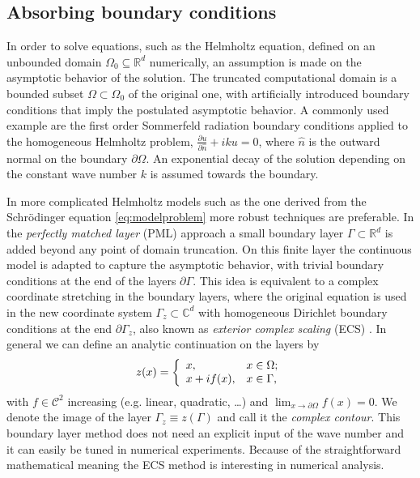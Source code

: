 \documentclass[mathpazo]{cicp}
\theoremstyle{definition}
\numberwithin{equation}{section}
\begin{document}
\subsection{Absorbing boundary conditions}
In order to solve equations, such as the Helmholtz equation, defined on an unbounded domain $\Omega_0\subseteq\mathbb{R}^d$ numerically, an assumption is made on the asymptotic behavior of the solution. The truncated computational domain is a bounded subset $\Omega\subset\Omega_0$ of the original one, with artificially introduced boundary conditions that imply the postulated asymptotic behavior. A commonly used example are the first order Sommerfeld radiation boundary conditions applied to the homogeneous Helmholtz problem, $\frac{\partial u}{\partial \hat{n}} + i k u = 0$, where $\hat{n}$ is the outward normal on the boundary $\partial\Omega$. An exponential decay of the solution depending on the constant wave number $k$ is assumed towards the boundary.

In more complicated Helmholtz models such as the one derived from the Schr\"odinger equation \eqref{eq:modelproblem} more robust techniques are preferable. In the \emph{perfectly matched layer} (PML) approach \cite{B94} a small boundary layer $\Gamma\subset\mathbb{R}^d$ is added beyond any point of domain truncation. On this finite layer the continuous model is adapted to capture the asymptotic behavior, with trivial boundary conditions at the end of the layers $\partial\Gamma$. This idea is equivalent to a complex coordinate stretching \cite{CW94,R95,TC98} in the boundary layers, where the original equation is used in the new coordinate system $\Gamma_z\subset\mathbb{C}^d$ with homogeneous Dirichlet boundary conditions at the end $\partial\Gamma_z$, also known as \emph{exterior complex scaling} (ECS) \cite{NB78,S79}. In general we can define an analytic continuation on the layers by
\begin{align*}
 z(x) = \left\{
  \begin{array}{ll}
    x, & \hbox{$x \in \Omega$;} \\
    x+if(x), & \hbox{$x \in \Gamma$,}
  \end{array}
\right.
\end{align*}
with $f \in \mathcal{C}^2$ increasing (e.g. linear, quadratic, \ldots) and $\displaystyle \lim_{x\to\partial\Omega}f(x) = 0$. We
denote the image of the layer $\Gamma_z\equiv z(\Gamma)$ and call it the \emph{complex contour}. This boundary layer method does not need an explicit input of the wave number and it can easily be tuned in numerical experiments. Because of the straightforward mathematical meaning the ECS method is interesting in numerical analysis.
\end{document}
